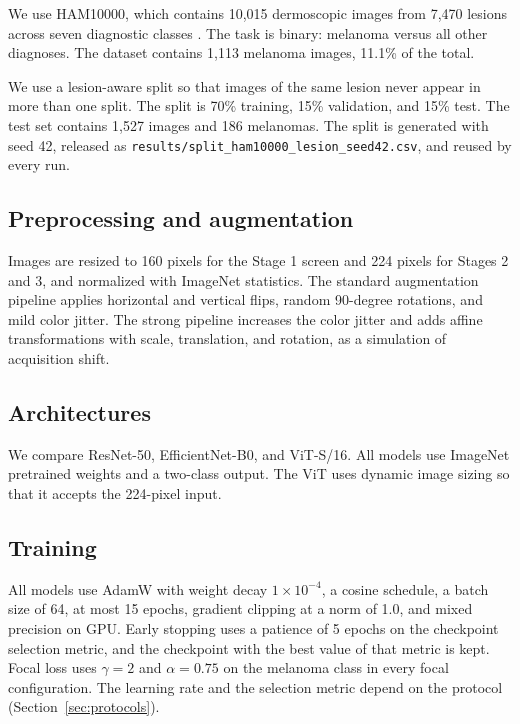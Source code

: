 \documentclass[11pt]{article}
\begin{document}
We use HAM10000, which contains 10,015 dermoscopic images from 7,470 lesions across seven diagnostic classes \citep{tschandl2018ham10000}. The task is binary: melanoma versus all other diagnoses. The dataset contains 1,113 melanoma images, 11.1\% of the total.

We use a lesion-aware split so that images of the same lesion never appear in more than one split. The split is 70\% training, 15\% validation, and 15\% test. The test set contains 1,527 images and 186 melanomas. The split is generated with seed 42, released as \texttt{results/split\_ham10000\_lesion\_seed42.csv}, and reused by every run.

\subsection{Preprocessing and augmentation}

Images are resized to 160 pixels for the Stage 1 screen and 224 pixels for Stages 2 and 3, and normalized with ImageNet statistics. The standard augmentation pipeline applies horizontal and vertical flips, random 90-degree rotations, and mild color jitter. The strong pipeline increases the color jitter and adds affine transformations with scale, translation, and rotation, as a simulation of acquisition shift.

\subsection{Architectures}

We compare ResNet-50, EfficientNet-B0, and ViT-S/16. All models use ImageNet pretrained weights and a two-class output. The ViT uses dynamic image sizing so that it accepts the 224-pixel input.

\subsection{Training}

All models use AdamW with weight decay $1\times10^{-4}$, a cosine schedule, a batch size of 64, at most 15 epochs, gradient clipping at a norm of 1.0, and mixed precision on GPU. Early stopping uses a patience of 5 epochs on the checkpoint selection metric, and the checkpoint with the best value of that metric is kept. Focal loss uses $\gamma=2$ and $\alpha=0.75$ on the melanoma class in every focal configuration. The learning rate and the selection metric depend on the protocol (Section~\ref{sec:protocols}).
\end{document}
